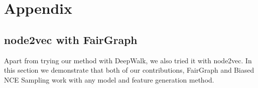 \documentclass{article}
\theoremstyle{plain}
\theoremstyle{definition}
\theoremstyle{remark}
\begin{document}









\newpage
\appendix
\onecolumn
\section{Appendix}

\subsection{node2vec with FairGraph}

Apart from trying our method with DeepWalk, we also tried it with node2vec. In this section we demonstrate that both of our contributions, FairGraph and Biased NCE Sampling work with any model and feature generation method. 
\end{document}

